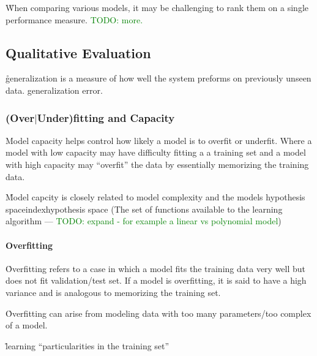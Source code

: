 \r{When comparing various models, it may be challenging to rank them on a single performance measure. \textcolor{green}{TODO: more.}}

\subsection{Qualitative Evaluation}

\r{generalization is a measure of how well the system preforms on previously unseen data. generalization error.}



\subsubsection{(Over$|$Under)fitting and Capacity}

\r{{Model capacity} helps control how likely a model is to overfit or underfit. Where a model with low capacity may have difficulty fitting a a training set and a model with high capacity may ``overfit'' the data by essentially memorizing the training data.}

\r{Model capcity is closely related to model complexity and the models {hypothesis space}index{hypothesis space} (The set of functions available to the learning algorithm --- \textcolor{green}{TODO: expand - for example a linear vs polynomial model})}


\paragraph{Overfitting}

\r{Overfitting refers to a case in which a model fits the training data very well but does not fit validation/test set. If a model is overfitting, it is said to have a high variance and is analogous to memorizing the training set.}

\r{Overfitting can arise from modeling data with too many parameters/too complex of a model.}

\r{learning ``particularities in the training set''}



